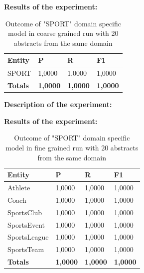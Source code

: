 \documentclass[thesis=M,english]{FITthesis}[2018/05/30]
\begin{document}
\textbf{Results of the experiment:}
	
	\begin{table}[H]\centering
		\begin{tabular}{|l|l|l|l|}
			\hline {\textbf{Entity}} & {\textbf{P}} & {\textbf{R}} & {\textbf{F1}}\\\hline
				SPORT & 1,0000 & 1,0000 & 1,0000\\\hline
				\textbf{Totals} & \textbf{1,0000} & \textbf{1,0000} & \textbf{1,0000}\\\hline
		\end{tabular}
		\caption{Outcome of "SPORT" domain specific model in coarse grained run with 20 abstracts from the same domain \label{table:SportDomainWithSportTop20Coarse}}			
	\end{table}	
	
\textbf{Description of the experiment:}

\textbf{Results of the experiment:}	

	\begin{table}[H]\centering
		\begin{tabular}{|l|l|l|l|}
			\hline {\textbf{Entity}} & {\textbf{P}} & {\textbf{R}} & {\textbf{F1}}\\\hline
				Athlete & 1,0000 & 1,0000 & 1,0000\\
				Coach & 1,0000 & 1,0000 & 1,0000\\
				SportsClub & 1,0000 & 1,0000 & 1,0000\\
				SportsEvent & 1,0000 & 1,0000 & 1,0000\\
				SportsLeague & 1,0000 & 1,0000 & 1,0000\\
				SportsTeam & 1,0000 & 1,0000 & 1,0000\\\hline
				\textbf{Totals} & \textbf{1,0000} & \textbf{1,0000} & \textbf{1,0000}\\\hline
		\end{tabular}
		\caption{Outcome of "SPORT" domain specific model in fine grained run with 20 abstracts from the same domain \label{table:SportDomainWithSportTop20Fine}}			
	\end{table}	
	
	
\end{document}
